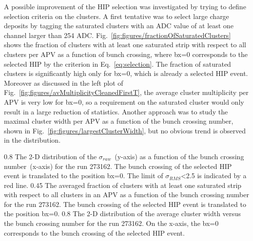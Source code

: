 
A possible improvement of the HIP selection was investigated by trying to define selection criteria on the clusters. A first tentative was to select large charge deposits by tagging the saturated clusters with an ADC value of at least one channel larger than 254 ADC. Fig.~\ref{fig:figures/fractionOfSaturatedClusters} shows the fraction of clusters with at least one saturated strip with respect to all clusters per APV as a function of bunch crossing, where bx=0 corresponds to the selected HIP by the criterion in Eq.~\ref{eq:selection}. The fraction of saturated clusters is significantly high only for bx=0, which is already a selected HIP event. Moreover as discussed in the left plot of Fig.~\ref{fig:figures/avMultiplicityCleanedFirstT}, the average cluster multiplicity per APV is very low for bx=0, so a requirement on the saturated cluster would only result in a large reduction of statistics. Another approach was to study the maximal cluster width per APV as a function of the bunch crossing number, shown in Fig.~\ref{fig:figures/largestClusterWidth}, but no obvious trend is observed in the distribution. 

                 {0.8}       %
                 {The 2-D distribution of the $\sigma_{raw}$~(y-axis) as a function of the bunch crossing number~(x-axis) for the run 273162. The bunch crossing of the selected HIP event is translated to the position bx=0. The limit of $\sigma_{RMS}$<2.5 is indicated by a red line. } %
                 {0.45}       %
                 {The averaged fraction of clusters with at least one saturated strip with respect to all clusters in an APV as a function of the bunch crossing  number for the run 273162. The bunch crossing of the selected HIP event is translated to the position bx=0. } %
                 {0.8}       %
                 {The 2-D distribution of the average cluster width versus the bunch crossing number for the run 273162. On the x-axis, the bx=0 corresponds to the bunch crossing of the selected HIP event.} %

